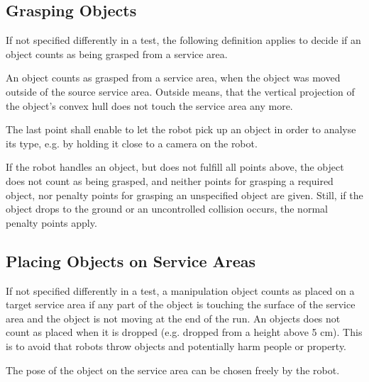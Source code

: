 \subsection{Grasping Objects} \label{ssec:GraspingObjects}
If not specified differently in a test, the following definition applies to decide if an object counts as being grasped from a service area.
\par
An object counts as grasped from a service area, when the object was moved outside of the source service area. Outside means, that the vertical projection of the object’s convex hull does not touch the service area any more.

\par
The last point shall enable to let the robot pick up an object in order to analyse its type, e.g. by holding it close to a camera on the robot.
\par
If the robot handles an object, but does not fulfill all points above, the object does not count as being grasped, and neither points for grasping a required object, nor penalty points for grasping an unspecified object are given. Still, if the object drops to the ground or an uncontrolled collision occurs, the normal penalty points apply.

\subsection{Placing Objects on Service Areas} \label{ssec:PlacingObjects}
If not specified differently in a test, a manipulation object counts as placed on a target service area if any part of the object is touching the surface of the service area and the object is not moving at the end of the run. An objects does not count as placed when it is dropped (e.g. dropped from a height above 5 cm). This is to avoid that robots throw objects and potentially harm people or property.
\par
The pose of the object on the service area can be chosen freely by the robot.


